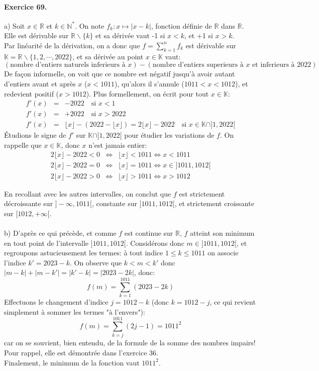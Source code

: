 \documentclass[a4paper,11pt]{article}
\begin{document}
\paragraph{Exercice 69.} a) Soit $x\in\mathbb{R}$ et $k\in\mathbb{N}^*$. On note $f_k:x\mapsto |x-k|$, fonction définie de $\mathbb{R}$ dans $\mathbb{R}$. \\
Elle est dérivable sur $\mathbb{R}\backslash{\{k\}}$ et sa dérivée vaut -1 si $x<k$, et +1 si $x>k$.\\
 Par linéarité de la dérivation, on a donc que $f=\sum_{k=1}^n{f_k}$ est dérivable sur $\mathbb{K}=\mathbb{R}\backslash\{1,2,\cdots,2022\}$,
 et sa dérivée au point $x\in\mathbb{K}$ vaut:
 \[
 (\textrm{nombre d'entiers naturels inferieurs à }x) - (\textrm{nombre d'entiers superieurs à } x \textrm{ et inferieurs à 2022})
 \]
 De façon informelle, on voit que ce nombre est négatif jusqu’à avoir autant d'entiers avant et après $x$ ($x<1011$), qu'alors il s'annule ($1011 < x < 1012$), et redevient positif ($x>1012$). Plus formellement, on écrit pour tout $x\in\mathbb{K}$:
\begin{eqnarray}
  f'(x) &=& -2022 \quad \textrm{si } x < 1 \nonumber \\
  f'(x) &=& +2022 \quad \textrm{si } x > 2022 \nonumber \\
  f'(x) &=& \lfloor x \rfloor - (2022-\lfloor x \rfloor)=2\lfloor x \rfloor -2022 \quad \textrm{si } x \in \mathbb{K}\cap ]1,2022[ \nonumber 
\end{eqnarray}
 Étudions le signe de $f'$ sur $\mathbb{K}\cap ]1,2022[$ pour étudier les variations de $f$. On rappelle que $x\in\mathbb{K}$, donc $x$ n'est jamais entier:
 \begin{eqnarray}
2\lfloor x \rfloor -2022 < 0 &\Leftrightarrow & \lfloor x \rfloor < 1011 \Leftrightarrow x < 1011 \nonumber \\
2\lfloor x \rfloor -2022 = 0 &\Leftrightarrow & \lfloor x \rfloor = 1011 \Leftrightarrow x \in ]1011, 1012[ \nonumber \\
2\lfloor x \rfloor -2022 > 0 &\Leftrightarrow & \lfloor x \rfloor > 1011 \Leftrightarrow x > 1012 \nonumber
 \end{eqnarray}

En recollant avec les autres intervalles, on conclut que $f$ est strictement décroissante sur $]-\infty, 1011[$, constante sur $]1011, 1012[$, et strictement croissante sur $[1012, +\infty[$. \\ \\
b) D’après ce qui précède, et comme $f$ est continue sur $\mathbb{R}$, $f$ atteint son minimum en tout point de l'intervalle $]1011,1012[$. Considérons donc $m\in]1011,1012[$, et regroupons astucieusement les termes: à tout indice $1 \leq k\leq 1011$ on associe l'indice $k'=2023-k$. On observe que $k<m<k'$ donc $|m-k|+|m-k'|=|k'-k|=|2023-2k|$, donc:
\[
f(m)=\sum_{k=1}^{1011}{(2023-2k)}
\]
Effectuons le changement d'indice $j=1012-k$ (donc $k=1012-j$, ce qui revient simplement à sommer les termes "à l'envers"):
\[
f(m)=\sum_{k=j}^{1011}{(2j-1)}=1011^2
\]
car on se souvient, bien entendu, de la formule de la somme des nombres impairs! Pour rappel, elle est démontrée dans l'exercice 36.\\
Finalement, le minimum de la fonction vaut $1011^2$.
\end{document}
